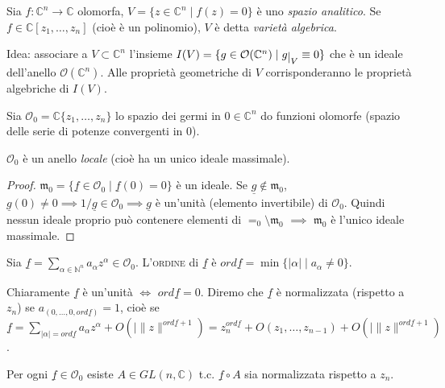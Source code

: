 \begin{defn}
  Sia $f:\mathbb{C}^n \longrightarrow \mathbb{C}$ olomorfa, $V=\{z \in \mathbb{C}^n \mid f(z)=0\}$ è uno \textit{spazio analitico}. Se $f \in \mathbb{C}[z_1,\dots,z_n]$ (cioè è un polinomio), $V$ è detta \textit{varietà algebrica}.
\end{defn}

Idea: associare a $V \subset \mathbb{C}^n$ l'insieme $I(V)=\{g \in \mathcal{O}(\mathbb{C}^n) \mid g\restrict{V} \equiv 0\}$ che è un ideale dell'anello $\mathcal{O}(\mathbb{C}^n)$. Alle proprietà geometriche di $V$ corrisponderanno le proprietà algebriche di $I(V)$.

Sia $\mathcal{O}_0=\mathbb{C}\{z_1,\dots,z_n\}$ lo spazio dei germi in $0 \in \mathbb{C}^n$ do funzioni olomorfe (spazio delle serie di potenze convergenti in $0$).

\begin{prop}
  $\mathcal{O}_0$ è un anello \textit{locale} (cioè ha un unico ideale massimale).
\end{prop}

\begin{proof}
  $\mathfrak{m}_0=\{\underline{f} \in \mathcal{O}_0 \mid \underline{f}(0)=0\}$ è un ideale.
  Se $\underline{g} \not\in \mathfrak{m}_0$, $\underline{g}(0)\not=0 \implies 1/\underline{g} \in \mathcal{O}_0 \implies \underline{g}$ è un'unità (elemento invertibile) di $\mathcal{O}_0$. Quindi nessun ideale proprio può contenere elementi di $\mathcal{=}_0\setminus\mathfrak{m}_0$ $\implies$ $\mathfrak{m}_0$ è l'unico ideale massimale.
\end{proof}

\begin{defn}
  Sia $\displaystyle \underline{f}=\sum_{\alpha \in \mathbb{N}^n} a_{\alpha}z^{\alpha} \in \mathcal{O}_0$. L'\textsc{ordine} di $\underline{f}$ è $ord{\underline{f}}=\min\{|\alpha| \mid a_{\alpha}\not=0\}$.
\end{defn}

Chiaramente $\underline{f}$ è un'unità $\iff$ $ord{\underline{f}}=0$. Diremo che $\underline{f}$ è normalizzata (rispetto a $z_n$) se $a_{(0,\dots,0,ord{\underline{f}})}=1$, cioè se $\displaystyle \underline{f}=\sum_{|\alpha|=ord{\underline{f}}}a_{\alpha}z^{\alpha}+O(|\|z\|^{ord{\underline{f}}+1})=z_n^{ord{\underline{f}}}+O(z_1,\dots,z_{n-1})+O(|\|z\|^{ord{\underline{f}}+1})$.

\begin{exc}
  Per ogni $\underline{f} \in \mathcal{O}_0$ esiste $A \in GL(n,\mathbb{C})$ t.c. $\underline{f}\circ A$ sia normalizzata rispetto a $z_n$.
\end{exc}

